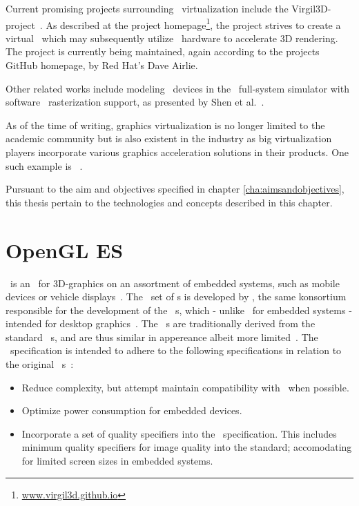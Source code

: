 Current promising projects surrounding \dvttermgpu\ virtualization include the Virgil3D-project~.
As described at the project homepage\footnote{\href{http://virgil3d.github.io/}{www.virgil3d.github.io}}, the project strives to create a virtual \dvttermgpu\ which may subsequently utilize \dvttermhost\ hardware to accelerate 3D rendering.
The project is currently being maintained, again according to the projects GitHub homepage, by Red Hat's Dave Airlie.

Other related works include modeling \dvttermgpu\ devices in the \dvttermqemu\ full-system simulator with software \dvttermopengles\ rasterization support, as presented by Shen et al.~.

As of the time of writing, graphics virtualization is no longer limited to the academic community but is also existent in the industry as big virtualization players incorporate various graphics acceleration solutions in their products.
One such example is \dvttermvmware ~.

Pursuant to the aim and objectives specified in chapter \ref{cha:aimsandobjectives}, this thesis pertain to the technologies and concepts described in this chapter.

\section{OpenGL ES}
\label{sec:backgroundandrelatedwork_opengles}
\dvttermopengles\ is an \dvttermapi\ for 3D-graphics on an assortment of embedded systems, such as mobile devices or vehicle displays~.
The \dvttermopengles\ set of \dvttermapi s is developed by \dvttermkhronos , the same konsortium responsible for the development of the \dvttermopengl\ \dvttermapi s, which - unlike \dvttermopengl\ for embedded systems - intended for desktop graphics~.
The \dvttermopengles\ \dvttermapi s are traditionally derived from the standard \dvttermopengl\ \dvttermapi s, and are thus similar in appereance albeit more limited~.
The \dvttermopengles\ specification is intended to adhere to the following specifications in relation to the original \dvttermopengl\ \dvttermapi s~:
\begin{itemize}[noitemsep]
	\item Reduce complexity, but attempt maintain compatibility with \dvttermopengl\ when possible.
	\item Optimize power consumption for embedded devices.
	\item Incorporate a set of quality specifiers into the \dvttermopengles\ specification. This includes minimum quality specifiers for image quality into the standard; accomodating for limited screen sizes in embedded systems.
\end{itemize}

